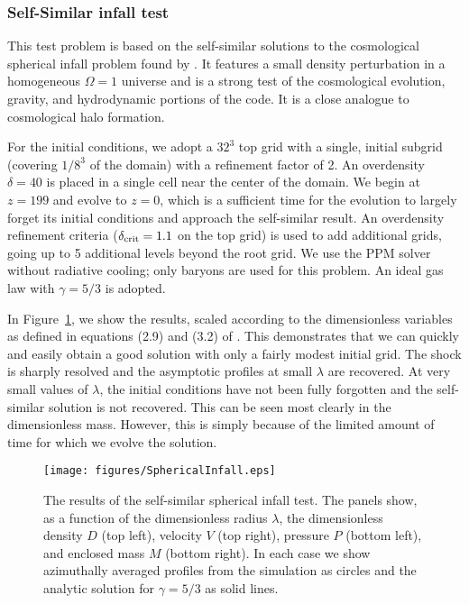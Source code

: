 \subsubsection{Self-Similar infall test}
\label{sec.tests.infall}

This test problem is based on the self-similar solutions to the
cosmological spherical infall problem found by
\citet{Bertschinger1985}.  It features a small density perturbation in
a homogeneous $\Omega = 1$ universe and is a strong test of the
cosmological evolution, gravity, and hydrodynamic portions of the
code.  It is a close analogue to cosmological halo formation.

For the initial conditions, we adopt a $32^3$ top grid with a single,
initial subgrid (covering $1/8^3$ of the domain) with a refinement
factor of 2.  An overdensity $\delta = 40$ is placed in a single cell
near the center of the domain.  We begin at $z=199$ and evolve to
$z=0$, which is a sufficient time for the evolution to largely forget
its initial conditions and approach the self-similar result.  An
overdensity refinement criteria ($\delta_{\rm crit} = 1.1$ on the top
grid) is used to add additional grids, going up to 5 additional levels
beyond the root grid.  We use the PPM solver without radiative
cooling; only baryons are used for this problem.  An ideal gas law
with $\gamma = 5/3$ is adopted.

In Figure~\ref{fig.sphericalinfall}, we show the results, scaled
according to the dimensionless variables as defined in equations (2.9)
and (3.2) of \citet{Bertschinger1985}.  This demonstrates that we can
quickly and easily obtain a good solution with only a fairly modest
initial grid.  The shock is sharply resolved and the asymptotic
profiles at small $\lambda$ are recovered.  At very small values of
$\lambda$, the initial conditions have not been fully forgotten and
the self-similar solution is not recovered.  This can be seen most
clearly in the dimensionless mass.  However, this is simply because of
the limited amount of time for which we evolve the solution.


\begin{figure}
\begin{center}
\texttt{[image: figures/SphericalInfall.eps]}
\caption{The results of the self-similar spherical infall test.  The
panels show, as a function of the dimensionless radius $\lambda$, the
dimensionless density $D$ (top left), velocity $V$ (top right),
pressure $P$ (bottom left), and enclosed mass $M$ (bottom right).  In
each case we show azimuthally averaged profiles from the simulation as
circles and the analytic solution for $\gamma = 5/3$ as solid lines.}
\label{fig.sphericalinfall}
\end{center}
\end{figure}

